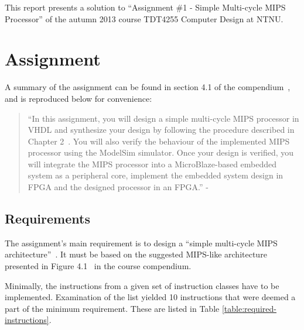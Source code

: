 This report presents a solution to ``Assignment \#1 - Simple Multi-cycle MIPS Processor'' of the autumn 2013 course TDT4255 Computer Design at NTNU.

\section{Assignment}

A summary of the assignment can be found in section 4.1 of the compendium~\cite[p.114]{compendium}, and is reproduced below for convenience:

\begin{quote}
``In this assignment, you will design a simple multi-cycle MIPS processor in VHDL and synthesize your design by following the procedure described in Chapter 2~\cite[of the compendium]{compendium}.
You will also verify the behaviour of the implemented MIPS processor using the ModelSim simulator.
Once your design is verified, you will integrate the MIPS processor into a MicroBlaze-based embedded system as a peripheral core, implement the embedded system design in FPGA and the designed processor in an FPGA.''
- \cite[p.114]{compendium} 
\end{quote}

\subsection{Requirements}

The assignment's main requirement is to design a ``simple multi-cycle MIPS architecture''~\cite[p.114]{compendium}. It must be based on the suggested MIPS-like architecture presented in Figure 4.1~\cite[p.115]{compendium} in the course compendium.

Minimally, the instructions from a given set of instruction classes have to be implemented. 
Examination of the list yielded 10 instructions that were deemed a part of the minimum requirement.
These are listed in Table \vref{table:required-instructions}.

